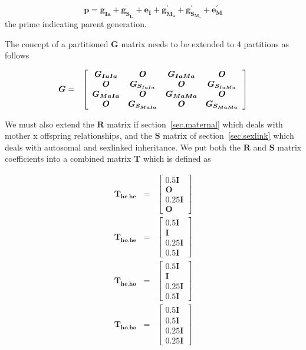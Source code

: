 \documentclass[titlepage]{article}  %
\begin{document}
\begin{displaymath}
\bm{p = g_{Ia} + g_{S_{I_{a}}} + e_{I}  + g^{\prime}_{M_{a}} + g^{\prime}_{S_{M_{a}}} + e^{\prime}_{M} }
\end{displaymath}
 the prime indicating parent generation.

The concept of a partitioned $\bm{G}$ matrix needs to be extended to 4 partitions as follows

\begin{eqnarray*}
\bm{G} & = &
\left[ \begin{array}{c c c c}
 \bm{G_{IaIa}} & \bm{O} & \bm{G_{IaMa}} & \bm{O} \\
 \bm{O} & \bm{G_{S_{IaIa}}} & \bm{O} & \bm{G_{S_{IaMa}}} \\
 \bm{G_{MaIa}} & \bm{O} & \bm{G_{MaMa}} & \bm{O} \\
 \bm{O} & \bm{G_{S_{MaIa}}} & \bm{O} & \bm{G_{S_{MaMa}}}
\end{array} \right]
\end{eqnarray*}

We must also extend the $\bm{R}$ matrix if section~\ref{sec.maternal} which deals with mother x offspring relationships, and the $\bm{S}$ matrix of section~\ref{sec.sexlink} which deals with autosomal and sexlinked inheritance. We put both the $\bm{R}$ and $\bm{S}$ matrix coefficients into a combined matrix $\bm{T}$ which is defined as

\begin{eqnarray*}
\bm{T_{he.he}} & = &
\left[ \begin{array}{c}
0.5 \bm{I} \\
\bm{O} \\
0.25 \bm{I} \\
\bm{O}
\end{array} \right] \\
\bm{T_{ho.he}} & = &
\left[ \begin{array}{c}
0.5 \bm{I} \\
\bm{I} \\
0.25 \bm{I} \\
0.5 \bm{I}
\end{array} \right] \\
\bm{T_{he.ho}} & = &
\left[ \begin{array}{c}
0.5 \bm{I} \\
\bm{I} \\
0.25 \bm{I} \\
0.5 \bm{I}
\end{array} \right] \\
\bm{T_{ho.ho}} & = &
\left[ \begin{array}{c}
0.5 \bm{I} \\
0.5 \bm{I} \\
0.25 \bm{I} \\
0.25 \bm{I}
\end{array} \right]
\end{eqnarray*}
\end{document}
